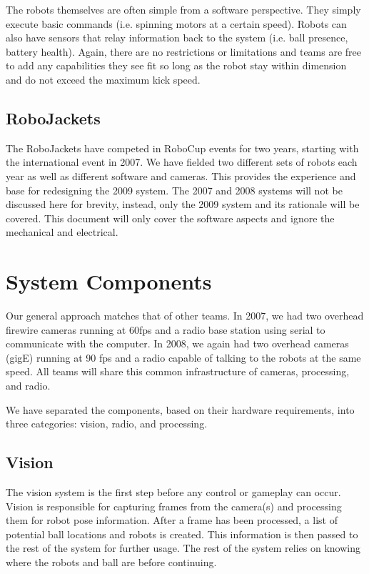 \documentclass[letterpaper]{llncs}
\begin{document}
The robots themselves are often simple from a software perspective. They simply execute basic commands (i.e. spinning motors at a certain speed). Robots can also have sensors that relay information back to the system (i.e. ball presence, battery health). Again, there are no restrictions or limitations and teams are free to add any capabilities they see fit so long as the robot stay within dimension and do not exceed the maximum kick speed.

\subsection{RoboJackets}
The RoboJackets have competed in RoboCup events for two years, starting with the international event in 2007. We have fielded two different sets of robots each year as well as different software and cameras. This provides the experience and base for redesigning the 2009 system. The 2007 and 2008 systems will not be discussed here for brevity, instead, only the 2009 system and its rationale will be covered. This document will only cover the software aspects and ignore the mechanical and electrical.

\section{System Components}
Our general approach matches that of other teams. In 2007, we had two overhead firewire cameras running at 60fps and a radio base station using serial to communicate with the computer. In 2008, we again had two overhead cameras (gigE) running at 90 fps and a radio capable of talking to the robots at the same speed. All teams will share this common infrastructure of cameras, processing, and radio. 

We have separated the components, based on their hardware requirements, into three categories: vision, radio, and processing.

\subsection{Vision}
The vision system is the first step before any control or gameplay can occur. Vision is responsible for capturing frames from the camera(s) and processing them for robot pose information. After a frame has been processed, a list of potential ball locations and robots is created. This information is then passed to the rest of the system for further usage. The rest of the system relies on knowing where the robots and ball are before continuing.
\end{document}
